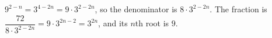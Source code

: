 $9^{2-n}=3^{4-2n}=9\cdot3^{2-2n}$, so the denominator is $8\cdot3^{2-2n}$. The fraction is $\dfrac{72}{8\cdot3^{2-2n}}=9\cdot3^{2n-2}=3^{2n}$, and its $n$th root is $\boxed{9}$.
